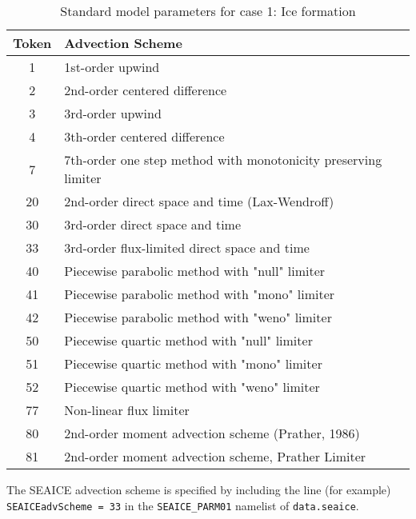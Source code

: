 \documentclass[11pt]{article}
\begin{document}
\begin{table}[h!]
\begin{tabularx}{\textwidth}{ c X }
\hline
Token  &  Advection Scheme \\ \hline \hline
  1   & 1st-order upwind \\ \hline
  2   & 2nd-order centered difference \\ \hline
  3   & 3rd-order upwind \\ \hline
  4   & 3th-order centered difference \\ \hline
  7   & 7th-order one step method with monotonicity preserving limiter \\ \hline
  20  & 2nd-order direct space and time (Lax-Wendroff) \\ \hline
  30  & 3rd-order direct space and time \\ \hline
  33  & 3rd-order flux-limited direct space and time \\ \hline
  40  & Piecewise parabolic method with "null" limiter \\ \hline
  41  & Piecewise parabolic method with "mono" limiter \\ \hline
  42  & Piecewise parabolic method with "weno" limiter \\ \hline
  50  & Piecewise quartic method with "null" limiter \\ \hline
  51  & Piecewise quartic method with "mono" limiter \\ \hline
  52  & Piecewise quartic method with "weno" limiter \\ \hline
  77  & Non-linear flux limiter \\ \hline
  80  & 2nd-order moment advection scheme (Prather, 1986) \\ \hline
  81  & 2nd-order moment advection scheme, Prather Limiter \\ \hline
\end{tabularx}
\caption{Standard model parameters for case 1: Ice formation}
\label{table:advectionSchemes}
\end{table}

The SEAICE advection scheme is specified by including the line (for example) \verb|SEAICEadvScheme = 33| in the \verb|SEAICE_PARM01| namelist of \verb|data.seaice|.
\end{document}
